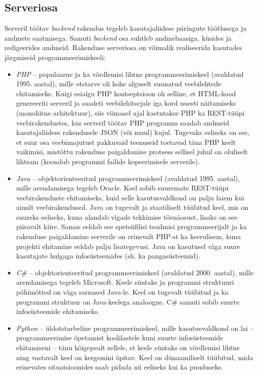 \subsection{Serveriosa}
\label{analysis_backend_subsection}
Serveril töötav \textit{backend} rakendus tegeleb kasutajaliidese päringute töötlusega ja andmete saatmisega.
Samuti \textit{backend} osa suhtleb andmebaasiga, küsides ja redigeerides andmeid. Rakenduse serveriosa on võimalik
realiseerida kasutades järgmiseid programmeerimiskeeli:
\begin{itemize}
    \item \textit{PHP} -- populaarne ja ka võrdlemisi lihtne programmeerimiskeel (avaldatud 1995. aastal), 
    mille otstarve oli kohe alguselt suunatud veebilehtede ehitamiseks. Kuigi esialgu PHP kontseptsioon oli selline, 
    et HTML-kood genereeriti serveril ja saadeti veebilehitsejale iga kord uuesti näitamiseks (monoliitne arhitektuur), 
    siis viimasel ajal kastutakse PHP ka REST-tüüpi veebirakendustes, kus serveril töötav PHP programm saadab 
    andmeid kasutajaliidese rakendusele JSON (või muul) kujul. Tugevaks eeliseks on see, et suur osa veebimajutust 
    pakkuvaid teenuseid toetavad täna PHP keelt vaikimisi, mistõttu rakenduse paigaldamise protsess sellisel juhul 
    on oluliselt lihtsam (koondub programmi failide kopeerimisele serverile).
    \item \textit{Java} -- objektorienteeritud programmeerimiskeel (avaldatud 1995. aastal), mille arendamisega 
    tegeleb Oracle. Keel sobib suuremate REST-tüüpi veebirakenduste ehitamiseks, kuid selle kasutusvaldkond on palju laiem kui 
    ainult veebirakendused. Java on tugevalt ja staatiliselt tüübitud keel, mis on suureks eeliseks, kuna alandab
    vigade tekkimise tõenäosust, lisaks on see piisavalt kiire.  Samas eeldab see spetsiifilisi teadmisi 
    programmeerijalt ja ka rakenduse paigaldamine serverile on erinevalt PHP-st ka keerulisem, kuna projekti 
    ehitamine eeldab palju lisategevusi. Java on kasutusel väga suure kasutajate hulgaga infosüsteemides (sh. ka pangasüsteemid).
    \item \textit{C\#} -- objektorienteeritud programmeerimiskeel (avaldatud 2000. aastal), mille arendamisega tegeleb Microsoft. 
    Keele süntaks ja programmi struktuuri põhimõtted on väga sarnased Java-le. Keel on tugevalt tüübitud ja 
    ka programmi struktuur on Java-keelega analoogne. C\# samuti sobib suurte infosüsteemide ehitamiseks.
    \item \textit{Python} --  üldotstarbeline programmeerimiskeel, mille kasutusvaldkond on lai -- programmeerimise 
    õpetamist koolilastele kuni suurte infosüsteemide ehitamiseni -- tänu kõigepealt sellele, et keele süntaks on 
    võrdlemisi lihtne ning vastavalt keel on kergemini õpitav. Keel on dünaamiliselt tüübitud, mida erinevates 
    situatsioonides saab pidada nii eeliseks kui ka puuduseks.
\end{itemize}

